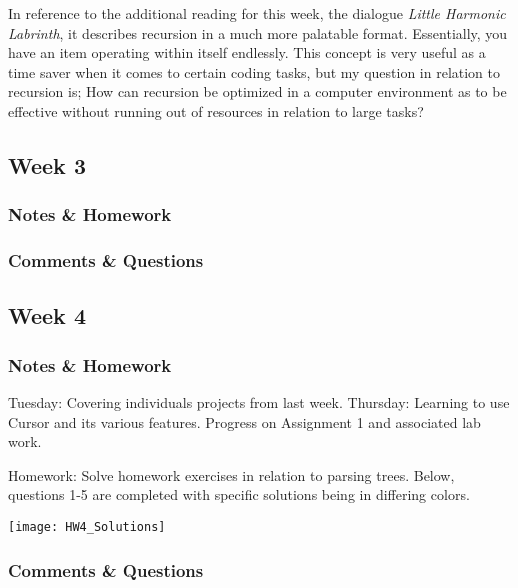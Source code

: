 \documentclass{article}
\theoremstyle{theorem}
\theoremstyle{definition}
\theoremstyle{remark}
\begin{document}
In reference to the additional reading for this week, the dialogue \textit{Little Harmonic Labrinth}, it describes recursion in a much more palatable format. Essentially, you have an item operating within itself endlessly. This concept is very useful as a time saver when it comes to certain coding tasks, but my question in relation to recursion is; How can recursion be optimized in a computer environment as to be effective without running out of resources in relation to large tasks? 

\subsection{Week 3}

\subsubsection*{Notes \& Homework}

\subsubsection*{Comments \& Questions}


\subsection{Week 4}

\subsubsection*{Notes \& Homework}
Tuesday: Covering individuals projects from last week. 
\newline Thursday: Learning to use Cursor and its various features. Progress on Assignment 1 and associated lab work.

Homework: Solve homework exercises in relation to parsing trees. Below, questions 1-5 are completed with specific solutions being in differing colors.


\graphicspath{ {C:/Users/jrmul/OneDrive/Documents/CPSC_Courses/CPSC_354/images/} }
\begin{center} \texttt{[image: HW4\_Solutions]} \end{center}

\subsubsection*{Comments \& Questions}
\end{document}
